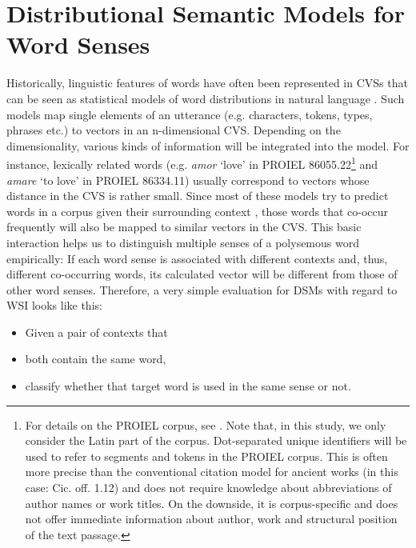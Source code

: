 \documentclass[oneside]{book}
\begin{document}
\section{Distributional Semantic Models for Word Senses}
Historically, linguistic features of words have often been represented in \gls{CVS}s \parencites{mikolovEfficientEstimationWord2013}{daiDocumentEmbeddingParagraph2015}{akbikContextualStringEmbeddings2018} that can be seen as statistical models of word distributions in natural language \parencite[1140]{bengioNeuralProbabilisticLanguage2003}. Such models map single elements of an utterance (e.g. characters, tokens, types, phrases etc.) to vectors in an n-dimensional \gls{CVS}. Depending on the dimensionality, various kinds of information will be integrated into the model. For instance, lexically related words (e.g. \textit{amor} `love' in PROIEL 86055.22\footnote{For details on the PROIEL corpus, see \textcite{haugCreatingParallelTreebank2008}. Note that, in this study, we only consider the Latin part of the corpus. Dot-separated unique identifiers will be used to refer to segments and tokens in the PROIEL corpus. This is often more precise than the conventional citation model for ancient works (in this case: Cic. off. 1.12) and does not require knowledge about abbreviations of author names or work titles. On the downside, it is corpus-specific and does not offer immediate information about author, work and structural position of the text passage.} and \textit{amare} `to love' in PROIEL 86334.11) usually correspond to vectors whose distance in the \gls{CVS} is rather small. Since most of these models try to predict words in a corpus given their surrounding context \parencite[5]{mikolovEfficientEstimationWord2013}, those words that co-occur frequently will also be mapped to similar vectors in the \gls{CVS}. This basic interaction helps us to distinguish multiple senses of a polysemous word empirically: If each word sense is associated with different contexts and, thus, different co-occurring words, its calculated vector will be different from those of other word senses. Therefore, a very simple evaluation for \gls{DSM}s with regard to \gls{WSI} looks like this:
\begin{itemize}
	\item Given a pair of contexts that
	\item both contain the same word,
	\item classify whether that target word is used in the same sense or not.
\end{itemize}
\end{document}
